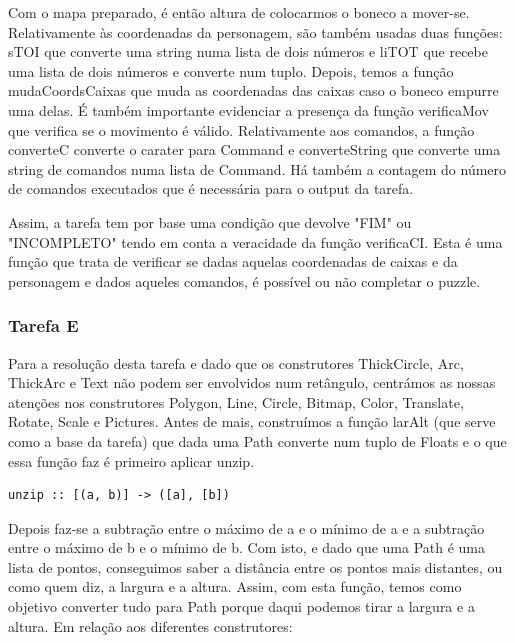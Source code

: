 \documentclass[a4paper]{article}
\begin{document}
Com o mapa preparado, é então altura de colocarmos o boneco a mover-se. Relativamente às coordenadas da personagem, são também usadas duas funções: sTOI que converte uma string numa lista de dois números e liTOT que recebe uma lista de dois números e converte num tuplo. Depois, temos a função mudaCoordsCaixas que muda as coordenadas das caixas caso o boneco empurre uma delas. É também importante evidenciar a presença da função verificaMov que verifica se o movimento é válido. Relativamente aos comandos, a função converteC converte o carater para Command e converteString que converte uma string de comandos numa lista de Command.
Há também a contagem do número de comandos executados que é necessária para o output da tarefa.

Assim, a tarefa tem por base uma condição que devolve "FIM" ou "INCOMPLETO" tendo em conta a veracidade da função verificaCI. Esta é uma função que trata de verificar se dadas aquelas coordenadas de caixas e da personagem e dados aqueles comandos, é possível ou não completar o puzzle.

\subsubsection{Tarefa E}
Para a resolução desta tarefa e dado que os construtores ThickCircle, Arc, ThickArc e Text não podem ser envolvidos num retângulo, centrámos as nossas atenções nos construtores Polygon, Line, Circle, Bitmap, Color, Translate, Rotate, Scale e Pictures.
Antes de mais, construímos a função larAlt (que serve como a base da tarefa) que dada uma Path converte num tuplo de Floats e o que essa função faz é primeiro aplicar unzip.

\begin{verbatim}
unzip :: [(a, b)] -> ([a], [b])
\end{verbatim}

Depois faz-se a subtração entre o máximo de a e o mínimo de a e a subtração entre o máximo de b e o mínimo de b. Com isto, e dado que uma Path é uma lista de pontos, conseguimos saber a distância entre os pontos mais distantes, ou como quem diz, a largura e a altura. Assim, com esta função, temos como objetivo converter tudo para Path porque daqui podemos tirar a largura e a altura.
Em relação aos diferentes construtores:
\end{document}
